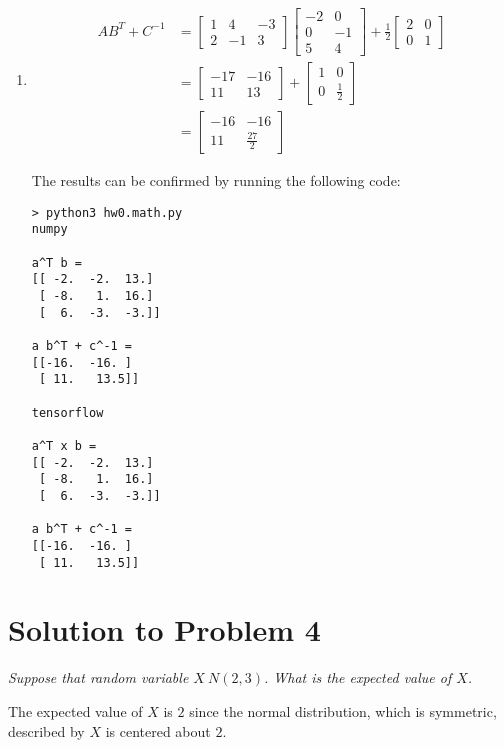 \documentclass[a4paper]{article}
\begin{document}
\begin{enumerate}[label=(\alph*)]
        
    \item 
        \begin{align*}
            AB^T + C^{-1} &=
            \begin{bmatrix}1&4&-3\\2&-1&3\end{bmatrix}
            \begin{bmatrix}-2&0\\0&-1\\5&4\end{bmatrix}
            + \frac{1}{2}\begin{bmatrix}2&0\\0&1\end{bmatrix} \\
            &= \begin{bmatrix}-17&-16\\11&13\end{bmatrix}
            + \begin{bmatrix}1&0\\0&\frac12\end{bmatrix} \\
            &= \begin{bmatrix}-16&-16\\11&\frac{27}2\end{bmatrix}
        \end{align*}
        
    The results can be confirmed by running the following code:

\begin{lstlisting}[]
> python3 hw0.math.py
numpy

a^T b =
[[ -2.  -2.  13.]
 [ -8.   1.  16.]
 [  6.  -3.  -3.]]

a b^T + c^-1 =
[[-16.  -16. ]
 [ 11.   13.5]]

tensorflow

a^T x b =
[[ -2.  -2.  13.]
 [ -8.   1.  16.]
 [  6.  -3.  -3.]]

a b^T + c^-1 =
[[-16.  -16. ]
 [ 11.   13.5]]
\end{lstlisting}
\end{enumerate}


\section{Solution to Problem 4}
\textit{
    Suppose that random variable $X ~ N(2,3)$. What is the expected value of $X$.
} \vspace{5mm}

The expected value of $X$ is $2$ since the normal distribution, which is symmetric, described by $X$ is centered about $2$.
\end{document}
